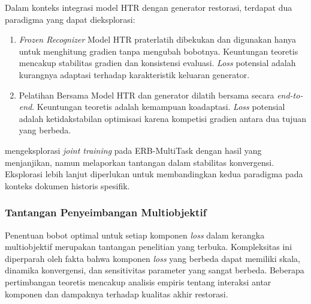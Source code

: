 \documentclass[12pt,a4paper]{article}
\begin{document}
\begin{enumerate}[leftmargin=*, labelindent=0pt, itemsep=1ex, topsep=0pt]
Dalam konteks integrasi model HTR dengan generator restorasi, terdapat dua paradigma yang dapat dieksplorasi:

\begin{enumerate}[leftmargin=1.5em, labelsep=0.5em, itemindent=0pt, label=\alph*., topsep=0pt, parsep=0pt, itemsep=0pt]
      \item \textit{Frozen Recognizer} \mbox{} Model HTR praterlatih dibekukan dan digunakan hanya untuk menghitung gradien tanpa mengubah bobotnya. Keuntungan teoretis mencakup stabilitas gradien dan konsistensi evaluasi. \textit{Loss} potensial adalah kurangnya adaptasi terhadap karakteristik keluaran generator.

      \item Pelatihan Bersama \mbox{} Model HTR dan generator dilatih bersama secara \textit{end-to-end}. Keuntungan teoretis adalah kemampuan koadaptasi. \textit{Loss} potensial adalah ketidakstabilan optimisasi karena kompetisi gradien antara dua tujuan yang berbeda.
\end{enumerate}

\textcite{erb2021} mengeksplorasi \textit{joint training} pada ERB-MultiTask dengan hasil yang menjanjikan, namun melaporkan tantangan dalam stabilitas konvergensi. Eksplorasi lebih lanjut diperlukan untuk membandingkan kedua paradigma pada konteks dokumen historis spesifik.

\end{enumerate}

\subsubsection{Tantangan Penyeimbangan Multiobjektif}
\label{subsubsec:weight-balancing}

Penentuan bobot optimal untuk setiap komponen \textit{loss} dalam kerangka multiobjektif merupakan tantangan penelitian yang terbuka. Kompleksitas ini diperparah oleh fakta bahwa komponen \textit{loss} yang berbeda dapat memiliki skala, dinamika konvergensi, dan sensitivitas parameter yang sangat berbeda. Beberapa pertimbangan teoretis mencakup analisis empiris tentang interaksi antar komponen dan dampaknya terhadap kualitas akhir restorasi.
\end{document}
